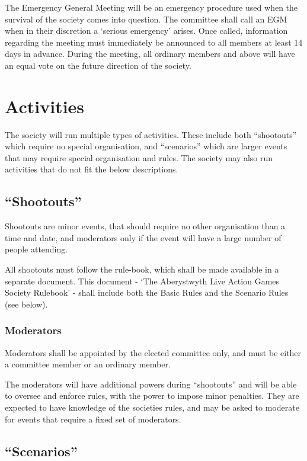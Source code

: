 \documentclass{report}
\begin{document}
	The Emergency General Meeting will be an emergency procedure used when the survival of the society comes into question. The committee shall call an EGM when in their discretion a `serious emergency' arises. Once called, information regarding the meeting must immediately be announced to all members at least 14 days in advance. During the meeting, all ordinary members and above will have an equal vote on the future direction of the society.
	
\chapter{Activities}

The society will run multiple types of activities. These include both ``shootouts'' which require no special organisation, and ``scenarios'' which are larger events that may require special organisation and rules. The society may also run activities that do not fit the below descriptions.

\section{``Shootouts''}

Shootouts are minor events, that should require no other organisation than a time and date, and moderators only if the event will have a large number of people attending.

All shootouts must follow the rule-book, which shall be made available in a separate document.
This document - `The Aberystwyth Live Action Games Society Rulebook' - shall include both the Basic Rules and the Scenario Rules (see below).

	\subsection*{Moderators}
	
	Moderators shall be appointed by the elected committee only, and must be either a committee member or an ordinary member.
	
	The moderators will have additional powers during ``shootouts'' and will be able to oversee and enforce rules, with the power to impose minor penalties. They are expected to have knowledge of the societies rules, and may be asked to moderate for events that require a fixed set of moderators.

\section{``Scenarios''}
\end{document}
